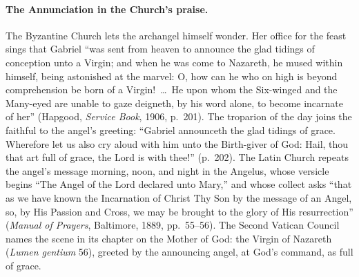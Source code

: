 \paragraph{The Annunciation in the Church's praise.} The Byzantine Church
lets the archangel himself wonder. Her office for the feast sings that
Gabriel ``was sent from heaven to announce the glad tidings of conception
unto a Virgin; and when he was come to Nazareth, he mused within himself,
being astonished at the marvel: O, how can he who on high is beyond
comprehension be born of a Virgin!~\dots\ He upon whom the Six-winged and
the Many-eyed are unable to gaze deigneth, by his word alone, to become
incarnate of her'' (Hapgood, \emph{Service Book}, 1906, p.~201). The
troparion of the day joins the faithful to the angel's greeting: ``Gabriel
announceth the glad tidings of grace. Wherefore let us also cry aloud with
him unto the Birth-giver of God: Hail, thou that art full of grace, the Lord
is with thee!'' (p.~202). The Latin Church repeats the angel's message
morning, noon, and night in the Angelus, whose versicle begins ``The Angel
of the Lord declared unto Mary,'' and whose collect asks ``that as we have
known the Incarnation of Christ Thy Son by the message of an Angel, so, by
His Passion and Cross, we may be brought to the glory of His resurrection''
(\emph{Manual of Prayers}, Baltimore, 1889, pp.~55--56). The Second Vatican
Council names the scene in its chapter on the Mother of God: the Virgin of
Nazareth  (\emph{Lumen gentium} 56), greeted by the announcing angel, at
God's command, as full of grace.

